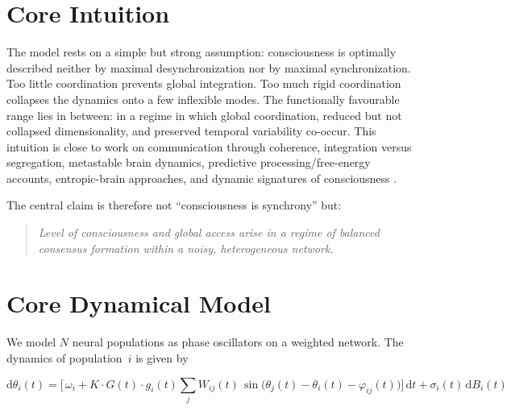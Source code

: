 ﻿\documentclass[11pt,a4paper]{article}
\theoremstyle{plain}
\theoremstyle{definition}
\theoremstyle{remark}
\begin{document}
\section{Core Intuition}
\label{sec:intuition}

The model rests on a simple but strong assumption: consciousness is optimally described neither by maximal desynchronization nor by maximal synchronization. Too little coordination prevents global integration. Too much rigid coordination collapses the dynamics onto a few inflexible modes. The functionally favourable range lies in between: in a regime in which global coordination, reduced but not collapsed dimensionality, and preserved temporal variability co-occur. This intuition is close to work on communication through coherence, integration versus segregation, metastable brain dynamics, predictive processing/free-energy accounts, entropic-brain approaches, and dynamic signatures of consciousness \citep{fries2015,kelso2012,deco2017,demertzi2019,northoff2017,friston2010,carhartharris2014,carhartharris2019,seth2011}.

The central claim is therefore not ``consciousness is synchrony'' but:

\begin{quote}
\itshape
Level of consciousness and global access arise in a regime of balanced consensus formation within a noisy, heterogeneous network.
\end{quote}


\section{Core Dynamical Model}
\label{sec:core}
\label{sec:kernmodell}

We model $N$ neural populations as phase oscillators on a weighted network. The dynamics of population~$i$ is given by

\begin{equation}
\label{eq:dynamics}
\mathrm{d}\theta_i(t)
= \biggl[\,\omega_i
+ K \cdot G(t) \cdot g_i(t) \sum_{j} W_{ij}(t)\,\sin\!\bigl(\theta_j(t) - \theta_i(t) - \varphi_{ij}(t)\bigr)
\biggr]\,\mathrm{d}t
+ \sigma_i(t)\,\mathrm{d}B_i(t)
\end{equation}
\end{document}
